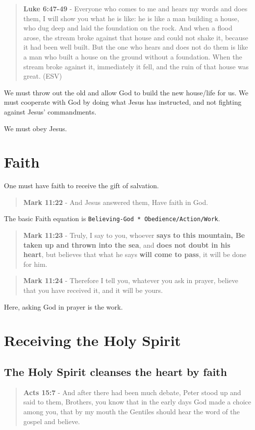 \documentclass[11pt]{article}
\begin{document}
\begin{quote}
\textbf{Luke 6:47-49} - Everyone who comes to me and hears my words and does them, I will show you what he is like: he is like a man building a house, who dug deep and laid the foundation on the rock. And when a flood arose, the stream broke against that house and could not shake it, because it had been well built. But the one who hears and does not do them is like a man who built a house on the ground without a foundation. When the stream broke against it, immediately it fell, and the ruin of that house was great. (ESV)
\end{quote}

We must throw out the old and allow God to build the new house/life for us.
We must cooperate with God by doing what Jesus has instructed, and not fighting against Jesus' commandments.

We must obey Jesus.

\section{Faith}
\label{sec:orgd4c59a4}
One must have faith to receive the gift of salvation.

\begin{quote}
\textbf{Mark 11:22} - And Jesus answered them, Have faith in God.
\end{quote}

The basic Faith equation is \texttt{Believing-God * Obedience/Action/Work}.

\begin{quote}
\textbf{Mark 11:23} - Truly, I say to you, whoever \textbf{says to this mountain, Be taken up and thrown into the sea}, and \textbf{does not doubt in his heart}, but believes that what he says \textbf{will come to pass}, it will be done for him.
\end{quote}

\begin{quote}
\textbf{Mark 11:24} - Therefore I tell you, whatever you ask in prayer, believe that you have received it, and it will be yours.
\end{quote}

Here, asking God in prayer is the work.

\section{Receiving the Holy Spirit}
\label{sec:org47f1ac1}
\subsection{The Holy Spirit cleanses the heart by faith}
\label{sec:org47c3caf}
\begin{quote}
\textbf{Acts 15:7} - And after there had been much debate, Peter stood up and said to them, Brothers, you know that in the early days God made a choice among you, that by my mouth the Gentiles should hear the word of the gospel and believe.
\end{quote}
\end{document}
